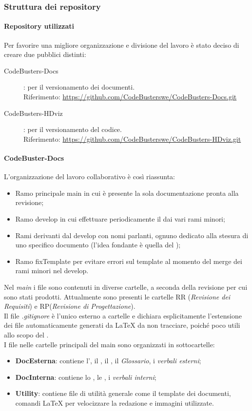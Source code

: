\subsubsection{Struttura dei repository}
\paragraph{Repository utilizzati}
Per favorire una migliore organizzazione e divisione del lavoro è stato deciso di creare due  pubblici distinti:
\begin{description}
	\item[CodeBusters-Docs] : per il versionamento dei documenti. \\
	Riferimento: \textcolor{blue}{\url{https://github.com/CodeBusterswe/CodeBusters-Docs.git}}
	\item[CodeBusters-HDviz] : per il versionamento del codice. \\
	Riferimento: \textcolor{blue}{\url{https://github.com/CodeBusterswe/CodeBusters-HDviz.git}}
\end{description}


\paragraph{CodeBuster-Docs}
L'organizzazione del lavoro collaborativo è così riassunta:
\begin{itemize}
	\item Ramo principale main in cui è presente la sola documentazione pronta alla revisione;	
	\item Ramo develop in cui effettuare periodicamente il  dai vari rami minori;
	\item Rami derivanti dal develop con nomi parlanti, ognuno dedicato alla stesura di uno specifico documento (l'idea fondante è quella del );
	\item Ramo fixTemplate per evitare errori sul template al momento del merge dei rami minori nel develop.
\end{itemize}
Nel \textit{main} i file sono contenuti in diverse cartelle, a seconda della revisione per cui sono stati prodotti. Attualmente sono presenti le cartelle RR (\textit{Revisione dei Requisiti}) e RP(\textit{Revisione di Progettazione}). \\
Il file \textit{.gitignore} è l'unico esterno a cartelle e dichiara esplicitamente l'estensione dei file automaticamente generati da \LaTeX{} da non tracciare, poiché poco utili allo scopo del . \\
I file nelle cartelle principali del main sono organizzati in sottocartelle:
\begin{itemize}
	\item \textbf{DocEsterna}: contiene l'\AdR{}, il \PdP{}, il \PdQ{}, il \textit{Glossario}, i \textit{verbali esterni};
	\item \textbf{DocInterna}: contiene lo \SdF{}, le \NdP{}, i \textit{verbali interni};
	\item \textbf{Utility}: contiene file di utilità generale come il template dei documenti, comandi \LaTeX{} per velocizzare la redazione e immagini utilizzate.
\end{itemize}
	
